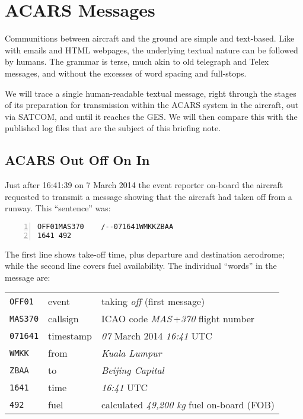 \documentclass[tikz,a4paper,12pt]{article}
\begin{document}
\section{ACARS Messages}

Communitions between aircraft and the ground are simple and
text-based.  Like with emails and HTML webpages, the underlying textual
nature can be followed by humans.  The grammar is terse, much akin to
old telegraph and Telex messages, and without the excesses of word
spacing and full-stops.

We will trace a single human-readable textual message, right through
the stages of its preparation for transmission within the \gls{ACARS} system
in the aircraft, out via SATCOM, and until it reaches the \gls{GES}.  We
will then compare this with the published log files that are the
subject of this briefing note.

\subsection{ACARS Out Off On In}

Just after 16:41:39 on 7 March 2014 the event reporter on-board the aircraft requested
to transmit a message showing that the aircraft had taken off from a runway.  This ``sentence'' was:

\begin{lstlisting}[language=ACARS,linewidth=\textwidth,numbers=left]
OFF01MAS370    /--071641WMKKZBAA
1641 492
\end{lstlisting}

The first line shows take-off time, plus departure and destination aerodrome;
while the second line covers fuel availability.  The individual ``words'' in the message are:

\begin{center}
\begin{tabular}{p{1.5cm}p{2cm}p{8cm}}
\hfill\texttt{OFF01}&event&taking \emph{off} (first message)\\
\hfill\texttt{MAS370}&callsign&\acrshort{ICAO} code \emph{MAS}\,+\emph{370} flight number\\
\hfill\texttt{071641}&timestamp& \emph{07} March 2014 \emph{16:41} UTC\\
\hfill\texttt{WMKK}&from&\emph{Kuala Lumpur}\\
\hfill\texttt{ZBAA}&to&\emph{Beijing Capital}\\
\hline
\hfill\texttt{1641}&time&\emph{16:41} UTC\\
\hfill\texttt{492}&fuel&calculated \emph{49,200 kg} fuel on-board (FOB)\\
\end{tabular}
\end{center}
\end{document}
